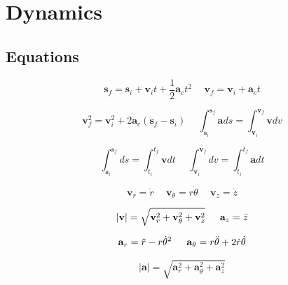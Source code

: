 \documentclass[twocolumn, 12pt]{article}
\begin{document}
\section*{Dynamics}
\subsection*{Equations}


\begin{equation*}
   \textbf{s}_f= \textbf{s}_i + \textbf{v}_it+ \frac{1}{2} \textbf{a}_ct^2   \hspace{15pt} \textbf{v}_f = \textbf{v}_i + \textbf{a}_ct 
\end{equation*}

\begin{equation*}
    \textbf{v}_f^2 = \textbf{v}_i^2+2 \textbf{a}_c (\textbf{s}_f-\textbf{s}_i) \hspace{15pt}      \int_{\textbf{s}_i}^{\textbf{s}_f} \textbf{a}ds=\int_{\textbf{v}_i}^{\textbf{v}_f}  \textbf{v}dv
\end{equation*}

\begin{equation*}
    \int_{\textbf{s}_i}^{\textbf{s}_f}ds =  \int_{t_i}^{t_f} \textbf{v}dt  \hspace{15pt}  \int_{\textbf{v}_i}^{\textbf{v}_f}dv =  \int_{t_i}^{t_f} \textbf{a}dt
\end{equation*}

\begin{equation*}
    \textbf{v}_r = \Dot{r}  \hspace{15pt} \textbf{v}_\theta = r\dot{\theta} \hspace{15pt}\textbf{v}_z = \dot{z}
\end{equation*}

\begin{equation*}
      |\textbf{v}| = \sqrt{\textbf{v}_r^2 + \textbf{v}_\theta^2 +\textbf{v}_z^2} \hspace{15pt} \textbf{a}_z=\Ddot{z}
\end{equation*}

\begin{equation*}
    \textbf{a}_r=\Ddot{r}-r\dot{\theta}^2 \hspace{15pt} \textbf{a}_\theta=r\Ddot{\theta}+2\dot{r}\dot{\theta}
\end{equation*}

\begin{equation*}
    |\textbf{a}|=\sqrt{\textbf{a}_r^2 + \textbf{a}_\theta^2 +\textbf{a}_z^2}
\end{equation*}
\end{document}
